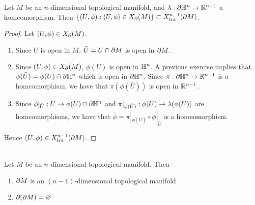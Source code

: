 \documentclass{book}
\begin{document}
	\begin{ex}
		Let $M$ be an $n$-dimensional topological manifold,  and $\lambda: \partial \mathbb{H}^n \rightarrow \mathbb{R}^{n-1}$ a homeomorphism. Then $\{(\bar{U}, \bar{\phi}): (U, \phi) \in X_{\partial}(M)\} \subset X^{n-1}_{\operatorname{Int}}(\partial M)$.
	\end{ex}

	\begin{proof}
		Let $(U, \phi) \in X_{\partial}(M)$.
		\begin{enumerate}
			\item Since $U$ is open in $M$, $\bar{U} = U \cap \partial M$ is open in $\partial M$. 
			\item Since $(U, \phi) \in X_{\partial}(M)$, $\phi(U)$ is open in $\mathbb{H}^n$. A previous exercise implies that $\phi(\bar{U}) = \phi(U) \cap \partial \mathbb{H}^n$ which is open in $\partial \mathbb{H}^n$. Since $\pi: \partial \mathbb{H}^n \rightarrow \mathbb{R}^{n-1}$ is a homeomorphism, we have that $\pi(\phi(\bar{U}))$ is open in $\mathbb{R}^{n-1}$. 
			\item Since $\phi|_{\bar{U}}: \bar{U} \rightarrow \phi(U) \cap \partial \mathbb{H}^n$ and $\pi|_{\phi(\bar{U})} : \phi(\bar{U}) \rightarrow \lambda(\phi(\bar{U})) $ are homeomorphisms, we have that $\bar{\phi} = \pi|_{\phi(\bar{U})} \circ \phi|_{\bar{U}}$ is a homeomorphism.
		\end{enumerate}
		Hence $(\bar{U}, \bar{\phi}) \in  X^{n-1}_{\operatorname{Int}}(\partial M)$.
	\end{proof}

	\begin{ex}  \\
		Let $M$ be an $n$-dimensional topological manifold. Then 
		\begin{enumerate}
			\item $\partial M$ is an $(n-1)$-dimensional topological manifold
			\item $\partial (\partial M) = \varnothing$
		\end{enumerate}
	\end{ex}
\end{document}
